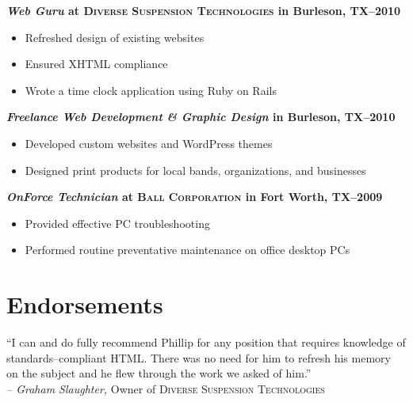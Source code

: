 \documentclass[margin]{res}
\newcommand{\sectionspace}{\vspace{8pt}}
\begin{document}
\begin{resume}
                \textbf{\textit{Web Guru}
                 at \textsc{Diverse Suspension Technologies} in Burleson, TX--2010}
                 \vspace{-10pt}\begin{itemize} \itemsep -2pt %
                   \item Refreshed design of existing websites
                   \item Ensured XHTML compliance
                   \item Wrote a time clock application using Ruby on Rails
                \end{itemize}
                
                \textbf{\textit{Freelance Web Development \textrm{\&} Graphic Design}
                in Burleson, TX--2010}
                \vspace{-10pt}\begin{itemize} \itemsep -2pt %
                  \item Developed custom websites and WordPress themes
                  \item Designed print products for local bands, organizations, and businesses
                \end{itemize}
                
                \textbf{\textit{OnForce Technician}
                at \textsc{Ball Corporation} in Fort Worth, TX--2009}
                \vspace{-10pt}\begin{itemize} \itemsep -2pt %
                  \item Provided effective PC troubleshooting
                  \item Performed routine preventative maintenance on office desktop PCs
                \end{itemize}

\sectionspace

      
\section{\textsf{Endorsements}}

                ``I can and do fully recommend Phillip for any position that requires 
                knowledge of standards--compliant HTML. There was no need for him to refresh his 
                memory on the subject and he flew through the work we asked of him.''             \\
                \textit{-- Graham Slaughter,} Owner of \textsc{Diverse Suspension Technologies}


\end{resume}
\end{document}
